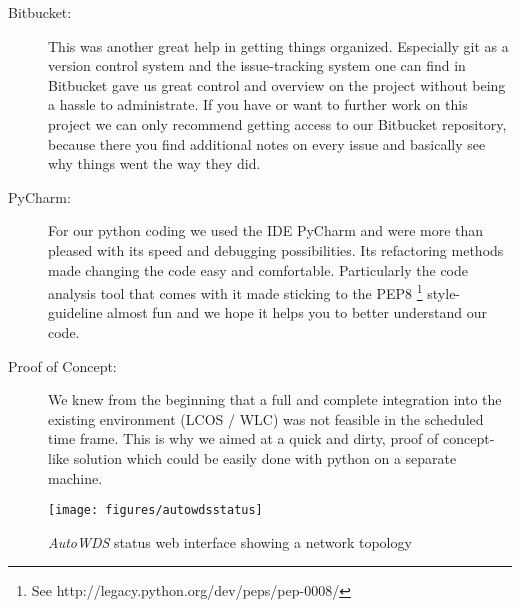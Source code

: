 \begin{description}
    \item [Bitbucket:]
      This was another great help in getting things organized. Especially git \cite{git} 
      as a version control system and the issue-tracking system one can find in Bitbucket \cite{bitbucket}
      gave us great control and overview on the project without being a hassle to administrate. 
      If you have or want to further work on this project we can only recommend
      getting access to our Bitbucket repository, because there you find additional notes on every issue and basically see why things went the way they did.
      
    \item [PyCharm:]
      For our python coding we used the \ac{IDE} PyCharm \cite{pycharm} and were more than pleased with its speed and debugging possibilities.
      Its refactoring methods made changing the code easy and comfortable. Particularly the code analysis tool that comes with it made sticking to the
      \ac{PEP8} \footnote{See http://legacy.python.org/dev/peps/pep-0008/} style-guideline almost fun and we hope it helps you to better understand our code.
      
\newpage
      
    \item [Proof of Concept:]
      We knew from the beginning that a full and complete integration into the existing environment (\ac{LCOS} / \ac{WLC}) was not feasible in the scheduled time frame.
      This is why we aimed at a quick and dirty, proof of concept-like solution which could be easily done with python on a separate machine.
      
    \end{description}

    \begin{figure}[h]
      \centering
      \texttt{[image: figures/autowdsstatus]}
      \caption{\textit{AutoWDS} status web interface showing a network topology}
      \label{fig:autowdsstatus}
    \end{figure}
    
\clearpage

  
